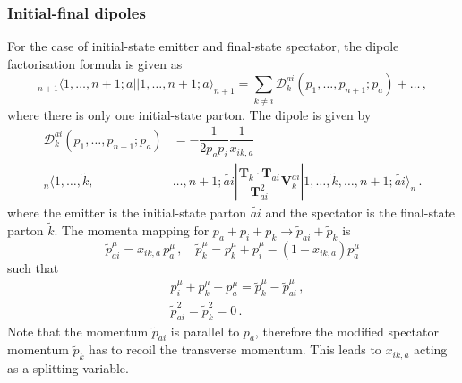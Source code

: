 \documentclass[main.tex]{subfiles}
\begin{document}
        \subsubsection{Initial-final dipoles}
        For the case of initial-state emitter and final-state spectator,
        the dipole factorisation formula is given as
        \begin{equation}\label{eqn:IF_factorisation}
            {}_{n+1} \langle 1, \ldots, n+1; a || 1, \ldots, n+1; a \rangle_{n+1} = \sum_{k \neq i}\mathcal{D}_{k}^{ai}(p_{1},\ldots,p_{n+1};p_{a}) + \ldots \, ,
        \end{equation}
        where there is only one initial-state parton. The dipole is given by
        \begin{equation}\label{eqn:D_aik}
            \begin{split}
            \mathcal{D}_{k}^{ai}(p_{1}, \ldots, p_{n+1};p_{a}) &= -\dfrac{1}{2p_{a}p_{i}}\dfrac{1}{x_{ik,a}} \\
            {}_{n}\langle 1, \ldots, \tilde{k}, &\ldots, n+1 ; \widetilde{ai} | \dfrac{\boldsymbol{T}_{k} \cdot \boldsymbol{T}_{ai}}{\boldsymbol{T}_{ai}^{2}} \boldsymbol{V}_{k}^{ai} | 1, \ldots, \tilde{k}, \ldots, n+1; \widetilde{ai} \rangle_{n} \, .
            \end{split}
        \end{equation}
        where the emitter is the initial-state parton $\widetilde{ai}$
        and the spectator is the final-state parton $\tilde{k}$.
        The momenta mapping for $p_{a} + p_{i} + p_{k} \rightarrow \tilde{p}_{ai} + \tilde{p}_{k}$ is
        \begin{equation}\label{eqn:IF_mapping}
            \tilde{p}_{ai}^{\mu} = x_{ik,a} \, p_{a}^{\mu} \, , \quad \tilde{p}_{k}^{\mu} = p_{k}^{\mu} + p_{i}^{\mu} - (1-x_{ik,a})p_{a}^{\mu} 
        \end{equation}
        such that
        \begin{equation}\label{eqn:IF_mapping_conditions}
            \begin{split}
            &p_{i}^{\mu} + p_{k}^{\mu} - p_{a}^{\mu} = \tilde{p}_{k}^{\mu} - \tilde{p}_{ai}^{\mu} \, , \\
            &\tilde{p}_{ai}^{2} = \tilde{p}_{k}^{2} = 0 \, .
            \end{split}
        \end{equation}
        Note that the momentum $\tilde{p}_{ai}$ is parallel
        to $p_{a}$, therefore the modified spectator momentum $\tilde{p}_{k}$
        has to recoil the transverse momentum. This leads to $x_{ik,a}$
        acting as a splitting variable.
\end{document}
